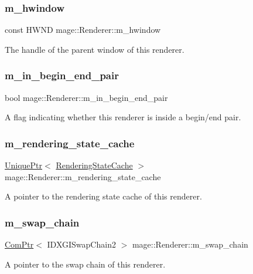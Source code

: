 \subsubsection{\texorpdfstring{m\+\_\+hwindow}{m\_hwindow}}
{\footnotesize\ttfamily const H\+W\+ND mage\+::\+Renderer\+::m\+\_\+hwindow\hspace{0.3cm}{\ttfamily [private]}}

The handle of the parent window of this renderer. \hypertarget{classmage_1_1_renderer_a3caa1bad6cbfde8f87f807e5c97924e3}{}\label{classmage_1_1_renderer_a3caa1bad6cbfde8f87f807e5c97924e3} 
\subsubsection{\texorpdfstring{m\+\_\+in\+\_\+begin\+\_\+end\+\_\+pair}{m\_in\_begin\_end\_pair}}
{\footnotesize\ttfamily bool mage\+::\+Renderer\+::m\+\_\+in\+\_\+begin\+\_\+end\+\_\+pair\hspace{0.3cm}{\ttfamily [private]}}

A flag indicating whether this renderer is inside a begin/end pair. \hypertarget{classmage_1_1_renderer_a3d9f823ecef314a974c4cdb3a71a1853}{}\label{classmage_1_1_renderer_a3d9f823ecef314a974c4cdb3a71a1853} 
\subsubsection{\texorpdfstring{m\+\_\+rendering\+\_\+state\+\_\+cache}{m\_rendering\_state\_cache}}
{\footnotesize\ttfamily \hyperlink{namespacemage_a3316d7143a973e37adf1110f2e80ca31}{Unique\+Ptr}$<$ \hyperlink{structmage_1_1_rendering_state_cache}{Rendering\+State\+Cache} $>$ mage\+::\+Renderer\+::m\+\_\+rendering\+\_\+state\+\_\+cache\hspace{0.3cm}{\ttfamily [private]}}

A pointer to the rendering state cache of this renderer. \hypertarget{classmage_1_1_renderer_a5419a7a11e8f0f69e92dd6a5cb9bd217}{}\label{classmage_1_1_renderer_a5419a7a11e8f0f69e92dd6a5cb9bd217} 
\subsubsection{\texorpdfstring{m\+\_\+swap\+\_\+chain}{m\_swap\_chain}}
{\footnotesize\ttfamily \hyperlink{namespacemage_ae74f374780900893caa5555d1031fd79}{Com\+Ptr}$<$ I\+D\+X\+G\+I\+Swap\+Chain2 $>$ mage\+::\+Renderer\+::m\+\_\+swap\+\_\+chain\hspace{0.3cm}{\ttfamily [private]}}

A pointer to the swap chain of this renderer. 